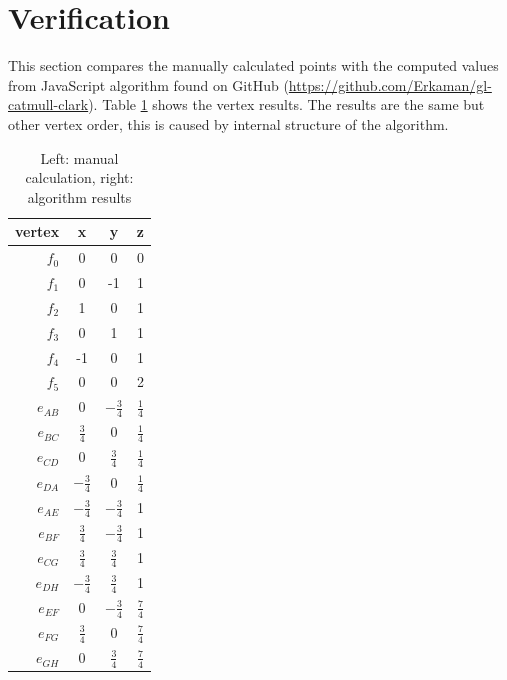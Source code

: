 \documentclass{article}
\begin{document}
\section{Verification}
This section compares the manually calculated points with the computed values from JavaScript algorithm found on GitHub (\href{https://github.com/Erkaman/gl-catmull-clark}{https://github.com/Erkaman/gl-catmull-clark}). Table \ref{table:1} shows the vertex results. The results are the same but other vertex order, this is caused by internal structure of the algorithm.
\begin{center}
\begin{table}[!h]
\renewcommand{\arraystretch}{1.5}
    \caption{Left: manual calculation, right: algorithm results}
    \label{table:1}
    \begin{minipage}{.5\linewidth}
      \centering
        \begin{tabular}{ | r | c | c | c | }
    \hline
    vertex & x & y & z \\ \hline
    $f_0$ & 0 & 0 & 0 \\ \hline
    $f_1$ & 0 & -1 & 1 \\ \hline
    $f_2$ & 1 & 0 & 1 \\ \hline
    $f_3$ & 0 & 1 & 1 \\ \hline
    $f_4$ & -1 & 0 & 1 \\ \hline    
    $f_5$ & 0 & 0 & 2 \\ \hline
    $e_{AB}$ & 0 & $ -\frac{3}{4} $ & $ \frac{1}{4} $ \\ \hline
    $e_{BC}$ & $ \frac{3}{4} $ & 0 & $ \frac{1}{4} $ \\ \hline
    $e_{CD}$ & 0 & $ \frac{3}{4} $ & $ \frac{1}{4} $ \\ \hline
    $e_{DA}$ & $ -\frac{3}{4} $ & 0 & $ \frac{1}{4} $ \\ \hline
    $e_{AE}$ & $ -\frac{3}{4} $ & $ -\frac{3}{4} $ & 1 \\ \hline    
    $e_{BF}$ & $ \frac{3}{4} $ & $ -\frac{3}{4} $ & 1 \\ \hline
    $e_{CG}$ & $ \frac{3}{4} $ & $ \frac{3}{4} $ & 1 \\ \hline    
    $e_{DH}$ & $ -\frac{3}{4} $ & $ \frac{3}{4} $ & 1 \\ \hline
    $e_{EF}$ & 0 & $ -\frac{3}{4} $ & $ \frac{7}{4} $ \\ \hline    
    $e_{FG}$ & $ \frac{3}{4} $ & 0 & $ \frac{7}{4} $ \\ \hline
    $e_{GH}$ & 0 & $ \frac{3}{4} $ & $ \frac{7}{4} $ \\ \hline    

\end{tabular}
\end{minipage}
\end{table}
\end{center}
\end{document}
